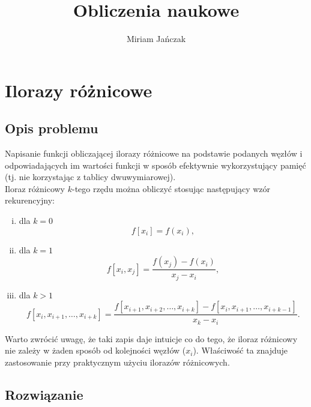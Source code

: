 \documentclass[11pt]{mk-polish-lab-report}
\author{Miriam Jańczak}
\title{Obliczenia naukowe}
\begin{document}
\maketitle

\section{Ilorazy różnicowe}

\subsection{Opis problemu}

Napisanie funkcji obliczającej ilorazy różnicowe na podstawie podanych węzłów i odpowiadających im wartości funkcji w sposób efektywnie wykorzystujący pamięć (tj. nie korzystając z tablicy dwuwymiarowej). \\


\noindent Iloraz różnicowy $k$-tego rzędu można obliczyć stosując następujący wzór rekurencyjny:
\begin{enumerate}[(i)]
\item dla $k = 0$  $$f[x_i] = f(x_i),$$
\item dla $k = 1$  $$f[x_i,x_j] = \frac{f(x_j) - f(x_i)}{x_j - x_i},$$  
\item dla $k > 1$  $$f[x_i,x_{i+1}, \ldots, x_{i+k}] = \frac{f[x_{i+1},x_{i+2}, \ldots, x_{i+k}] - f[x_{i}, x_{i+1}, \ldots, x_{i+k-1}]}{x_k - x_i}.$$
\end{enumerate}

\noindent Warto zwrócić uwagę, że taki zapis daje intuicje co do tego, że iloraz różnicowy nie zależy w żaden sposób od kolejności węzłów ($x_{i}$). Właściwość ta znajduje zastosowanie przy praktycznym użyciu ilorazów różnicowych.

\subsection{Rozwiązanie}
\end{document}

